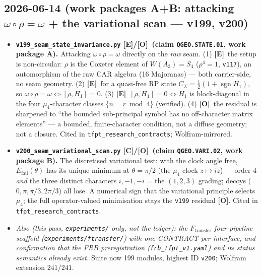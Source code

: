 \documentclass[11pt]{article}
\providecommand{\mE}{\textbf{[E]}}\providecommand{\mC}{\textbf{[C]}}
\providecommand{\mO}{\textbf{[O]}}\providecommand{\mX}{\textbf{[X]}}
\providecommand{\vref}[1]{\texttt{#1}}
\begin{document}
\subsection*{2026-06-14 (work packages A+B: attacking $\omega\circ\rho=\omega$ + the variational scan --- v199, v200)}
\begin{itemize}
\item \textbf{\texttt{v199\_seam\_state\_invariance.py} \mE/\mO\ (claim \texttt{QGEO.STATE.01}, work package A).}
  Attacking $\omega\circ\rho=\omega$ directly on the \emph{raw} seam. (1) \mE\ the setup is non-circular:
  $\rho$ is the Coxeter element of $W(A_3)=S_4$ ($\rho^4=1$, \vref{v117}), an automorphism of the raw CAR
  algebra (16 Majoranas) --- both carrier-side, no seam geometry. (2) \mE\ for a quasi-free RP state
  $C_\Sigma=\tfrac12(1{+}\operatorname{sgn}H_1)$, so $\omega\circ\rho=\omega\Leftrightarrow[\rho,H_1]=0$.
  (3) \mE\ $[\rho,H_1]=0\Leftrightarrow H_1$ is block-diagonal in the four $\mu_4$-character classes
  $\{n{=}r\bmod4\}$ (verified). (4) \mO\ the residual is sharpened to ``the bounded sub-principal symbol has
  no off-character matrix elements'' --- a bounded, finite-character condition, not a diffuse geometry; not
  a closure. Cited in \texttt{tfpt\_research\_contracts}; Wolfram-mirrored.
\item \textbf{\texttt{v200\_seam\_variational\_scan.py} \mC/\mO\ (claim \texttt{QGEO.VARI.02}, work package B).}
  The discretised variational test: with the clock angle free, $E_{\mathrm{fail}}(\theta)$ has its unique
  minimum at $\theta=\pi/2$ (the $\mu_4$ clock $z\mapsto iz$) --- order-4 \emph{and} the three distinct
  characters $i,-1,-i$ = the $(1,2,3)$ grading; decoys ($0,\pi,\pi/3,2\pi/3$) all lose. A numerical sign
  that the variational principle selects $\mu_4$; the full operator-valued minimisation stays the
  \vref{v199} residual \mO. Cited in \texttt{tfpt\_research\_contracts}.
\item \emph{Also (this pass, \texttt{experiments/} only, not the ledger): the $F_{\mathrm{transfer}}$
  four-pipeline scaffold (\texttt{experiments/ftransfer/}) with one CONTRACT per interface, and confirmation
  that the FRB preregistration (\texttt{frb\_tfpt\_v1.yaml}) and its status semantics already exist.}
  Suite now 199 modules, highest ID \texttt{v200}; Wolfram extension $241/241$.
\end{itemize}
\end{document}
